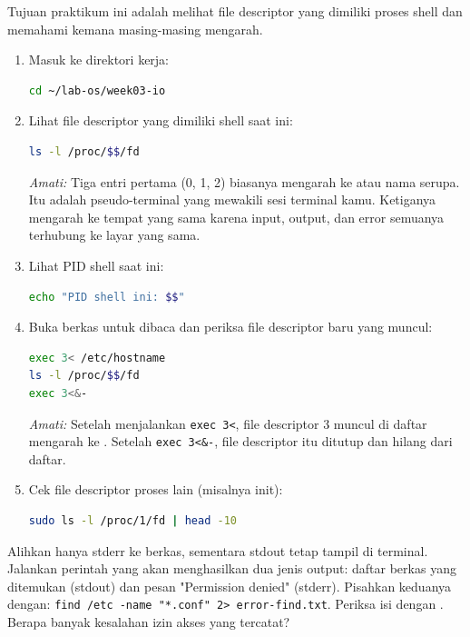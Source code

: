 Tujuan praktikum ini adalah melihat file descriptor yang dimiliki proses shell dan memahami kemana masing-masing mengarah.

\begin{enumerate}
    \item Masuk ke direktori kerja:
\begin{lstlisting}[language=bash, caption={Masuk ke direktori kerja}]
cd ~/lab-os/week03-io
\end{lstlisting}

    \item Lihat file descriptor yang dimiliki shell saat ini:
\begin{lstlisting}[language=bash, caption={File descriptor proses shell aktif}]
ls -l /proc/$$/fd
\end{lstlisting}
    \textit{Amati:} Tiga entri pertama (0, 1, 2) biasanya mengarah ke  atau nama serupa. Itu adalah pseudo-terminal yang mewakili sesi terminal kamu. Ketiganya mengarah ke tempat yang sama karena input, output, dan error semuanya terhubung ke layar yang sama.

    \item Lihat PID shell saat ini:
\begin{lstlisting}[language=bash, caption={PID shell saat ini}]
echo "PID shell ini: $$"
\end{lstlisting}

    \item Buka berkas untuk dibaca dan periksa file descriptor baru yang muncul:
\begin{lstlisting}[language=bash, caption={Amati penambahan file descriptor baru}]
exec 3< /etc/hostname
ls -l /proc/$$/fd
exec 3<&-
\end{lstlisting}
    \textit{Amati:} Setelah menjalankan \texttt{exec 3<}, file descriptor 3 muncul di daftar mengarah ke . Setelah \texttt{exec 3<\&-}, file descriptor itu ditutup dan hilang dari daftar.

    \item Cek file descriptor proses lain (misalnya init):
\begin{lstlisting}[language=bash, caption={File descriptor proses PID 1}]
sudo ls -l /proc/1/fd | head -10
\end{lstlisting}
\end{enumerate}

\begin{challengebox}
Alihkan hanya stderr ke berkas, sementara stdout tetap tampil di terminal. Jalankan perintah  yang akan menghasilkan dua jenis output: daftar berkas yang ditemukan (stdout) dan pesan "Permission denied" (stderr). Pisahkan keduanya dengan: \texttt{find /etc -name "*.conf" 2> error-find.txt}. Periksa isi  dengan . Berapa banyak kesalahan izin akses yang tercatat?
\end{challengebox}

